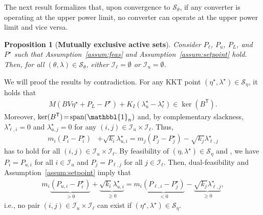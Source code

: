 \documentclass[twocolumn,twoside,journal]{IEEEtran}
\DeclareMathOperator{\vspan}{span}
\newcommand{\mc}{\mathcal}
\newcommand\red[1]{{\color{red}#1}}
\newtheorem{proposition}{Proposition}
\begin{document}

The next result formalizes that, upon convergence to $\mathcal{S}_{\theta}$, if any converter is operating at the upper power limit, no  converter can operate at the upper power limit and vice versa.

\begin{proposition}[\textbf{Mutually exclusive active sets}]\label{prop:activesets}
    Consider $P_\ell$, $P_u$, $P_L$, and $P^\star$ such that Assumption~\ref{assum:feas} and Assumption~\ref{assum:setpoint} hold.  Then, for all $(\theta,\lambda) \in \mathcal{S}_{\theta}$, either $\mathcal{I}_{\ell} = \emptyset$ or $\mathcal{I}_{u} = \emptyset$.
\end{proposition}
\begin{IEEEproof}
We will proof the results by contradiction. For any KKT point $(\eta^\star, \lambda^\star) \in \mc S_\eta$, it holds that
\begin{align*}
    M\left(BV\eta^\star + P_{L} - P^\star\right) + K_I (\lambda^\star_{u} - \lambda^\star_{\ell}) \in \ker(B^\mathsf{T}).
\end{align*}
Moreover, $\ker(B^\mathsf{T})\!=\!\vspan(\mathbbl{1}_n)$ and, by complementary slackness, $\lambda^\star_{\ell,i}=0$ and $\lambda^\star_{u,j}=0$ for any $(i,j) \in \mathcal{I}_{u} \times \mathcal{I}_{\ell}$. Thus,
\begin{align*}
    m_i\left(P_i -P^\star_{i}\right) &+ \sqrt{k_i}\lambda^\star_{u, i} = m_j\left(P_j -P^\star_{j}\right) - \sqrt{k_j}\lambda^\star_{\ell, j}
\end{align*} 
has to hold for all $(i,j) \in \mathcal{I}_{u} \times \mathcal{I}_{\ell}$. By feasibility of $(\eta, \lambda^\star) \in \mathcal{S}_\eta$ and , we have $P_{i} = P_{u, i}$ for all $i \in \mathcal{I}_{u}$ and $P_{j} = P_{\ell, j}$ for all $j \in \mathcal{I}_{\ell}$. Then, dual-feasibility and Assumption~\ref{assum:setpoint} imply that
\begin{align*}
m_i\underbrace{\left(P_{u, i}- P_{i}^\star\right)}_{> 0}   + \underbrace{\sqrt{k_i}\lambda^\star_{u, i}}_{\geq 0} = m_i \underbrace{\left(P_{\ell, i} - P_{j}^\star\right)}_{< 0} - \underbrace{\sqrt{k_j}\lambda^\star_{\ell, j}}_{\geq 0},
\end{align*}
i.e., no pair $(i,j) \in \mathcal{I}_u \times \mc I_\ell$ can exist if $(\eta^\star, \lambda^\star) \in \mc S_\eta$.
\end{IEEEproof}
\end{document}
